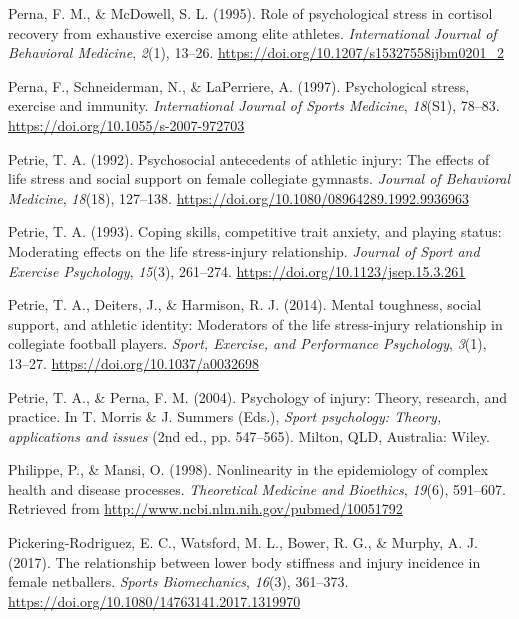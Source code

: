 \documentclass[
  english,
  man,floatsintext]{apa6}
\begin{document}
\leavevmode\hypertarget{ref-Perna1995}{}%
Perna, F. M., \& McDowell, S. L. (1995). Role of psychological stress in cortisol recovery from exhaustive exercise among elite athletes. \emph{International Journal of Behavioral Medicine}, \emph{2}(1), 13--26. \url{https://doi.org/10.1207/s15327558ijbm0201_2}

\leavevmode\hypertarget{ref-Perna1997}{}%
Perna, F., Schneiderman, N., \& LaPerriere, A. (1997). Psychological stress, exercise and immunity. \emph{International Journal of Sports Medicine}, \emph{18}(S1), 78--83. \url{https://doi.org/10.1055/s-2007-972703}

\leavevmode\hypertarget{ref-Petrie1992}{}%
Petrie, T. A. (1992). Psychosocial antecedents of athletic injury: The effects of life stress and social support on female collegiate gymnasts. \emph{Journal of Behavioral Medicine}, \emph{18}(18), 127--138. \url{https://doi.org/10.1080/08964289.1992.9936963}

\leavevmode\hypertarget{ref-Petrie1993}{}%
Petrie, T. A. (1993). Coping skills, competitive trait anxiety, and playing status: Moderating effects on the life stress-injury relationship. \emph{Journal of Sport and Exercise Psychology}, \emph{15}(3), 261--274. \url{https://doi.org/10.1123/jsep.15.3.261}

\leavevmode\hypertarget{ref-Petrie2014}{}%
Petrie, T. A., Deiters, J., \& Harmison, R. J. (2014). Mental toughness, social support, and athletic identity: Moderators of the life stress-injury relationship in collegiate football players. \emph{Sport, Exercise, and Performance Psychology}, \emph{3}(1), 13--27. \url{https://doi.org/10.1037/a0032698}

\leavevmode\hypertarget{ref-Perna2004}{}%
Petrie, T. A., \& Perna, F. M. (2004). Psychology of injury: Theory, research, and practice. In T. Morris \& J. Summers (Eds.), \emph{Sport psychology: Theory, applications and issues} (2nd ed., pp. 547--565). Milton, QLD, Australia: Wiley.

\leavevmode\hypertarget{ref-Philippe1998}{}%
Philippe, P., \& Mansi, O. (1998). Nonlinearity in the epidemiology of complex health and disease processes. \emph{Theoretical Medicine and Bioethics}, \emph{19}(6), 591--607. Retrieved from \url{http://www.ncbi.nlm.nih.gov/pubmed/10051792}

\leavevmode\hypertarget{ref-PickeringRodriguez2017}{}%
Pickering-Rodriguez, E. C., Watsford, M. L., Bower, R. G., \& Murphy, A. J. (2017). The relationship between lower body stiffness and injury incidence in female netballers. \emph{Sports Biomechanics}, \emph{16}(3), 361--373. \url{https://doi.org/10.1080/14763141.2017.1319970}
\end{document}
